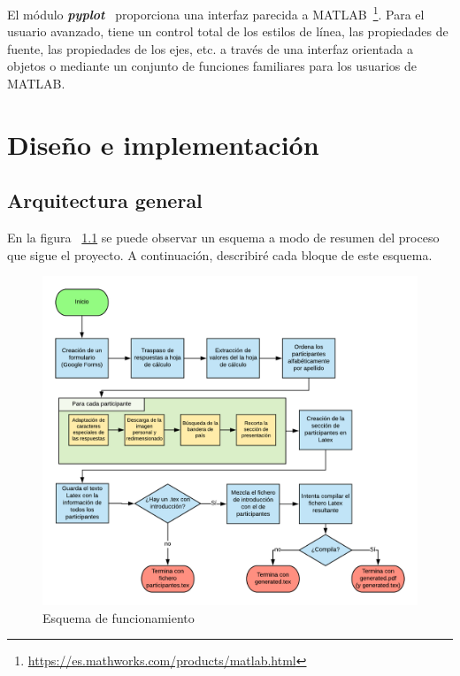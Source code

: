 \documentclass[a4paper, 12pt]{book}
\begin{document}
El módulo \textit{\textbf{pyplot}}~\cite{pyplot:1} proporciona una interfaz parecida a MATLAB~\footnote{\url{https://es.mathworks.com/products/matlab.html}}. Para el usuario avanzado, tiene un control total de los estilos de línea, las propiedades de fuente, las propiedades de los ejes, etc. a través de una interfaz orientada a objetos o mediante un conjunto de funciones familiares para los usuarios de MATLAB.



\cleardoublepage
\chapter{Diseño e implementación}
\label{chap:diseño}

\section{Arquitectura general}
\label{sec:arquitectura}
En la figura ~\ref{fig:esquema} se puede observar un esquema a modo de resumen del proceso que sigue el proyecto. A continuación, describiré cada bloque de este esquema.

\begin{figure}[h!]
	\centering
	\includegraphics[width=12cm, keepaspectratio]{img/Esquema}
	\caption{Esquema de funcionamiento}
	\label{fig:esquema}
\end{figure}
\end{document}
